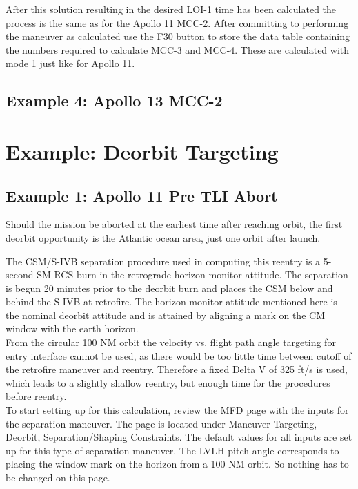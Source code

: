\documentclass[11pt]{article} %
\begin{document}
After this solution resulting in the desired LOI-1 time has been calculated the process is the same as for the Apollo 11 MCC-2. After committing to performing the maneuver as calculated use the F30 button to store the data table containing the numbers required to calculate MCC-3 and MCC-4. These are calculated with mode 1 just like for Apollo 11.\\

\subsection{Example 4: Apollo 13 MCC-2}

\newpage
\section{Example: Deorbit Targeting}
\subsection{Example 1: Apollo 11 Pre TLI Abort}

Should the mission be aborted at the earliest time after reaching orbit, the first deorbit opportunity is the Atlantic ocean area, just one orbit after launch.

The CSM/S-IVB separation procedure used in computing this reentry is a 5-second SM RCS burn in the retrograde horizon monitor attitude. The separation is begun 20 minutes prior to the deorbit burn and places the CSM below and behind the S-IVB at retrofire. The horizon monitor attitude mentioned here is the nominal deorbit attitude and is attained by aligning a mark on the CM window with the earth horizon.\\

From the circular 100 NM orbit the velocity vs. flight path angle targeting for entry interface cannot be used, as there would be too little time between cutoff of the retrofire maneuver and reentry. Therefore a fixed Delta V of 325 ft/s is used, which leads to a slightly shallow reentry, but enough time for the procedures before reentry.\\

To start setting up for this calculation, review the MFD page with the inputs for the separation maneuver. The page is located under Maneuver Targeting, Deorbit, Separation/Shaping Constraints. The default values for all inputs are set up for this type of separation maneuver. The LVLH pitch angle corresponds to placing the window mark on the horizon from a 100 NM orbit. So nothing has to be changed on this page.\\
\end{document}
